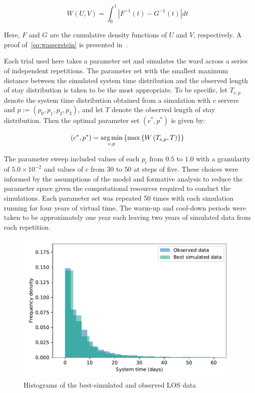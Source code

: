\begin{equation}\label{eq:wasserstein}
    W(U, V) = \int_{0}^{1} \left\vert F^{-1}(t) - G^{-1}(t) \right\vert dt
\end{equation}

Here, \(F\) and \(G\) are the cumulative density functions of \(U\) and \(V\),
respectively. A proof of~\eqref{eq:wasserstein} is presented
in~\cite{Ramdas2017}.

Each trial used here takes a parameter set and simulates the ward across a
series of independent repetitions. The parameter set with the smallest maximum distance
between the simulated system time distribution and the observed length of stay
distribution is taken to be the most appropriate. To be specific, let
\(T_{c,p}\) denote the system time distribution obtained from a simulation with
\(c\) servers and \(p := \left(p_0,p_1,p_2,p_3\right)\), and let \(T\) denote
the observed length of stay distribution. Then the optimal parameter set
\(\left(c^*, p^*\right)\) is given by:

\begin{equation}\label{eq:parameters}
    \left(c^*, p^*\right) = \argmin_{c, p} \left\{%
        \max \left\{ W\left(T_{c,p}, T\right) \right\}%
    \right\}
\end{equation}

The parameter sweep included values of each \(p_l\) from \(0.5\) to \(1.0\) with
a granularity of \(5.0 \times 10^{-2}\) and values of \(c\) from \(30\) to
\(50\) at steps of five. These choices were informed by the assumptions of the
model and formative analysis to reduce the parameter space given the
computational resources required to conduct the simulations. Each parameter set
was repeated 50 times with each simulation running for four years of virtual
time. The warm-up and cool-down periods were taken to be approximately one year
each leaving two years of simulated data from each repetition.

\begin{figure}
    \centering
    \includegraphics[width=\imgwidth]{best_params}
    \caption{%
        Histograms of the best-simulated and observed LOS data
    }\label{fig:best_params}
\end{figure}

